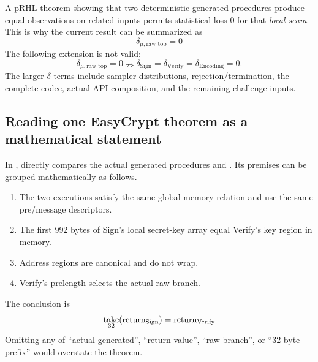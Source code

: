 A pRHL theorem showing that two deterministic generated procedures produce
equal observations on related inputs permits statistical loss 0 for that
\emph{local seam}. This is why the current result can be summarized as
\[
  \delta_{\mu,\mathrm{raw\_top}}=0
\]
The following extension is not valid:
\[
  \delta_{\mu,\mathrm{raw\_top}}=0
  \nRightarrow
  \delta_{\mathrm{Sign}}=
  \delta_{\mathrm{Verify}}=
  \delta_{\mathrm{Encoding}}=0.
\]
The larger \(\delta\) terms include sampler distributions, rejection/termination,
the complete codec, actual API composition, and the remaining challenge inputs.

\subsection{Reading one EasyCrypt theorem as a mathematical statement}

In ,
 directly compares the actual
generated procedures  and
. Its premises can be grouped mathematically as
follows.

\begin{enumerate}
  \item The two executions satisfy the same global-memory relation and use the
        same pre/message descriptors.
  \item The first 992 bytes of Sign's local secret-key array equal Verify's
        key region in memory.
  \item Address regions are canonical and do not wrap.
  \item Verify's prelength selects the actual raw branch.
\end{enumerate}

The conclusion is
\[
  \mathop{\mathrm{take}}_{32}(\operatorname{return}_{\mathrm{Sign}})
  =\operatorname{return}_{\mathrm{Verify}}
\]
Omitting any of “actual generated”, “return value”, “raw branch”, or
“32-byte prefix” would overstate the theorem.
